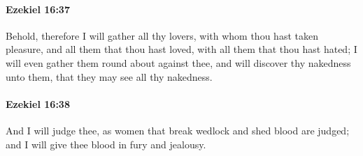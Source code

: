 		\paragraph{Ezekiel 16:37} %
			\label{EZEKIEL-16-37}

			Behold, therefore I will gather all thy lovers, with whom thou hast taken pleasure, and all them that thou hast loved, with all them that thou hast hated; I will even gather them round about against thee, and will discover thy nakedness unto them, that they may see all thy nakedness.


		\paragraph{Ezekiel 16:38} %
			\label{EZEKIEL-16-38}

			And I will judge thee, as women that break wedlock and shed blood are judged; and I will give thee blood in fury and jealousy.

